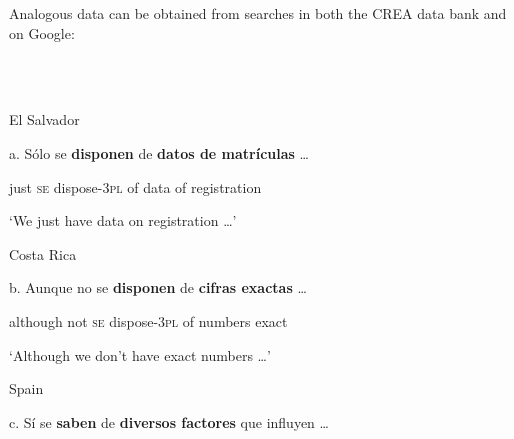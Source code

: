 \documentclass[output=paper]{langsci/langscibook}
\begin{document}
\begin{styleBodyTextIndentii}
Analogous data can be obtained from searches in both the CREA data bank and on Google:
\end{styleBodyTextIndentii}

\begin{styleBodyTextIndentii}
\ea%
    \label{ex:key:28}
    \gll\\
        \\
    \glt
    \z

          El Salvador
\end{styleBodyTextIndentii}

\begin{styleBodyTextIndentii}
a.   Sólo se  \textbf{disponen}     de  \textbf{datos de  matrículas} …     
\end{styleBodyTextIndentii}

\begin{styleBodyTextIndentii}
       just  \textsc{se}   dispose{}-\textsc{3pl} of  data    of  registration
\end{styleBodyTextIndentii}

\begin{styleBodyTextIndentii}
        ‘We just have data on registration …’
\end{styleBodyTextIndentii}

\begin{styleBodyTextIndentii}
  Costa Rica
\end{styleBodyTextIndentii}

\begin{styleBodyTextIndentii}
b.   Aunque   no   se \textbf{disponen}      de  \textbf{cifras       exactas} …   
\end{styleBodyTextIndentii}

\begin{styleBodyTextIndentii}
        although not \textsc{se}   dispose{}-\textsc{3pl}  of   numbers  exact
\end{styleBodyTextIndentii}

\begin{styleBodyTextIndentii}
       ‘Although we don’t have exact numbers …’
\end{styleBodyTextIndentii}

\begin{styleBodyTextIndentii}
  Spain
\end{styleBodyTextIndentii}

\begin{styleBodyTextIndentii}
c.   Sí   se  \textbf{saben}        de \textbf{diversos factores} que influyen …  
\end{styleBodyTextIndentii}
\end{document}
